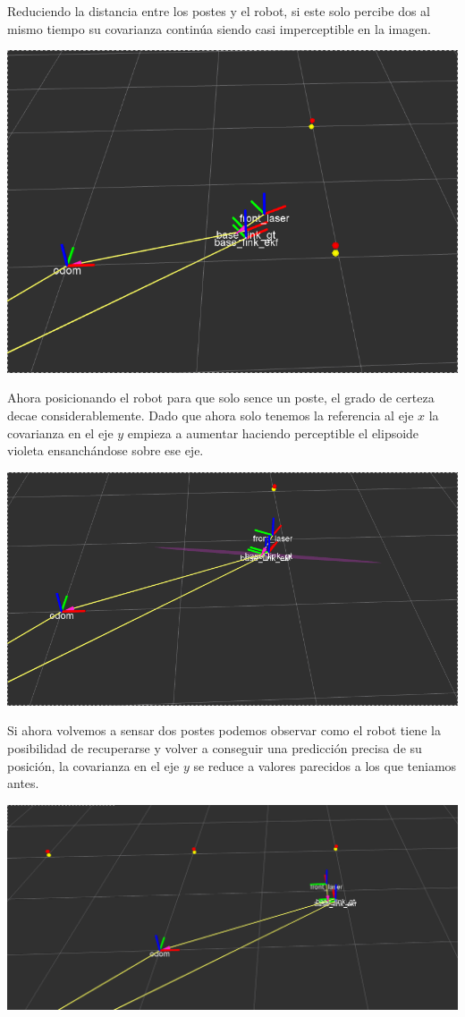 Reduciendo la distancia entre los postes y el robot, si este solo percibe dos al mismo tiempo su covarianza continúa siendo casi imperceptible en la imagen.

\includegraphics[scale=0.3]{punto4/ekfViendoDosPostes.png}

Ahora posicionando el robot para que solo sence un poste, el grado de certeza decae considerablemente. Dado que ahora solo tenemos la referencia al eje $x$ la covarianza en el eje $y$ empieza a aumentar haciendo perceptible el elipsoide violeta ensanchándose sobre ese eje.

\includegraphics[scale=0.3]{punto4/ekfViendoUnPoste.png}

Si ahora volvemos a sensar dos postes podemos observar como el robot tiene la posibilidad de recuperarse y volver a conseguir una predicción precisa de su posición, la covarianza en el eje $y$ se reduce a valores parecidos a los que teniamos antes.

\includegraphics[scale=0.3]{punto4/ekfViendoTresPostesOtraVez.png}

